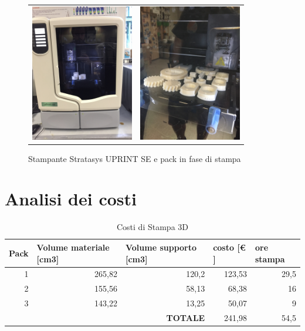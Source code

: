 \documentclass[%
corpo=11pt,
twoside,
 stile=classica,
oldstyle,
greek,%
]{toptesi}
\begin{document}
	\begin{figure}
		\centering
		\begin{tabular}{ll}
		\includegraphics[height=6cm,keepaspectratio]{image/uprint.jpg}
		&
		\includegraphics[height=6cm,keepaspectratio]{image/uprintp.jpg}
		\end{tabular}	
	\caption{Stampante Stratasys UPRINT SE e pack in fase di stampa}
	\label{fig:uprint}
	\end{figure}	
	
	\section{Analisi dei costi}
	\begin{table}[htbp]
		\centering
		\caption{Costi di Stampa 3D}
		\begin{tabular}{rr|r|r|r|}
			\hline
			\multicolumn{1}{|l|}{\textbf{Pack}} & \multicolumn{1}{l|}{\textbf{Volume materiale [cm3]}} & \multicolumn{1}{l|}{\textbf{Volume supporto [cm3]}} & \multicolumn{1}{l|}{\textbf{costo [€ ]}} & \multicolumn{1}{l|}{\textbf{ore stampa}} \bigstrut\\
			\hline
			\multicolumn{1}{|r|}{1} & 265,82 & 120,2 & 123,53 & 29,5 \bigstrut\\
			\hline
			\multicolumn{1}{|r|}{2} & 155,56 & 58,13 & 68,38 & 16 \bigstrut\\
			\hline
			\multicolumn{1}{|r|}{3} & 143,22 & 13,25 & 50,07 & 9 \bigstrut\\
			\hline
			&       & \textbf{TOTALE} & 241,98 & 54,5 \bigstrut\\
			\cline{3-5}    \end{tabular}%
		\label{tab:printcost}%
	\end{table}%
	
\end{document}
